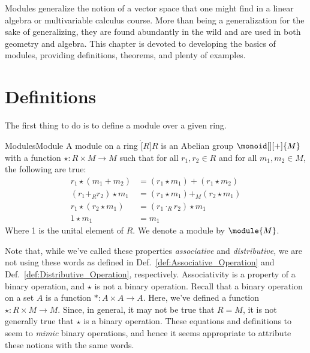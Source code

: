Modules generalize the notion of a vector space that one might find in a linear
algebra or multivariable calculus course. More than being a generalization for
the sake of generalizing, they are found abundantly in the wild and are used in
both geometry and algebra. This chapter is devoted to developing the basics of
modules, providing definitions, theorems, and plenty of examples.
\section{Definitions}
    The first thing to do is to define a module over a given ring.
    \begin{fdefinition}{Modules}{Module}
        A \gls{module} on a \gls{ring} $\ring[R]{R}$ is an
        \gls{Abelian group} $\monoid[][+]{M}$ with a \gls{function}
        $\star:R\times{M}\rightarrow{M}$ such that for all $r_{1},r_{2}\in{R}$
        and for all $m_{1},m_{2}\in{M}$, the following are true:
        \begin{align}
            r_{1}\star(m_{1}+m_{2})
                &=(r_{1}\star{m}_{1})+(r_{1}\star{m}_{2})
                \tag{Scalar Distributivity}\\
            (r_{1}+_{R}r_{2})\star{m}_{1}
                &=(r_{1}\star{m}_{1})+_{M}(r_{2}\star{m}_{1})
                \tag{Module Distributivity}\\
            r_{1}\star(r_{2}\star{m}_{1})
                &=(r_{1}\cdot_{R}r_{2})\star{m}_{1}
                \tag{Associativity}\\
            1\star{m}_{1}&=m_{1}
            \tag{Identity}
        \end{align}
        Where 1 is the unital element of $R$. We denote a module by
        $\module{M}$.
    \end{fdefinition}
    Note that, while we've called these properties \textit{associative} and
    \textit{distributive}, we are not using these words as defined in
    Def.~\ref{def:Associative_Operation} and
    Def.~\ref{def:Distributive_Operation}, respectively.
    Associativity is a property of a binary operation, and $\star$ is not a
    binary operation. Recall that a binary operation on a set $A$ is a function
    $*:A\times{A}\rightarrow{A}$. Here, we've defined a function
    $\star:R\times{M}\rightarrow{M}$. Since, in general, it may not be true that
    $R=M$, it is not generally true that $\star$ is a binary operation. These
    equations and definitions to seem to \textit{mimic} binary operations, and
    hence it seems appropriate to attribute these notions with the same words.
